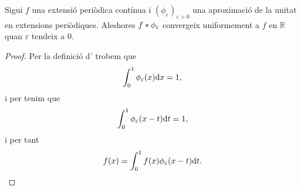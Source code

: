 \documentclass[../Apunts.tex]{subfiles}
\begin{document}
	\begin{theorem}
		\label{thm:la convolució per extensions periòdiques és invariant per aproximacions de la unitat en extensions periòdiques}
		Sigui \(f\) una extensió periòdica contínua i \((\phi_{\varepsilon})_{\varepsilon>0}\) una aproximació de la unitat en extensions periòdiques. Aleshores \(f\ast\phi_{\varepsilon}\) convergeix uniformement a \(f\) en \(\mathbb{R}\) quan \(\varepsilon\) tendeix a \(0\).
		\begin{proof}
			Per la definició d' trobem que
			\[\int_{0}^{1}\phi_{\varepsilon}(x)\mathrm{d} x=1,\]
			i per  tenim que
			\[\int_{0}^{1}\phi_{\varepsilon}(x-t)\mathrm{d} t=1,\]
			i per tant
			\[f(x)=\int_{0}^{1}f(x)\phi_{\varepsilon}(x-t)\mathrm{d} t.\]
			

\end{proof}
\end{theorem}
\end{document}
